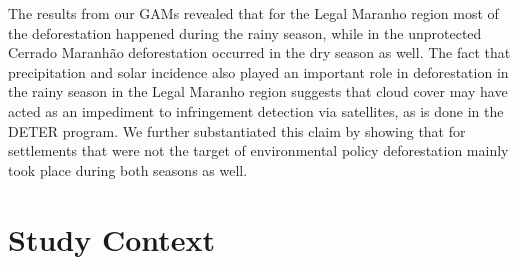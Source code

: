 
The results from our GAMs revealed that for the Legal Maranho region most of the deforestation happened during the rainy season, while in the unprotected Cerrado Maranhão deforestation occurred in the dry season as well.  The fact that precipitation and solar incidence also played an important role in deforestation in the rainy season in the Legal Maranho region suggests that cloud cover may have acted as an impediment to infringement detection via satellites, as is done in the DETER program. We further substantiated this claim by showing that for settlements that were not the target of environmental policy deforestation mainly took place during both seasons as well.     







\section{Study Context}  %
\label{S:2}
